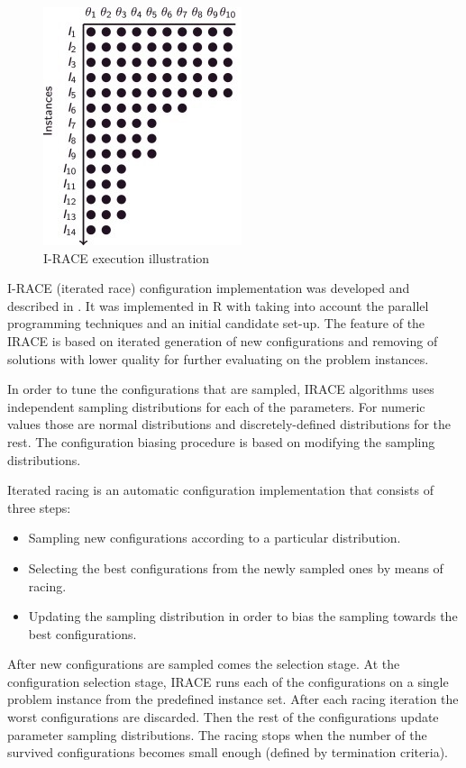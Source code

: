 \documentclass[12pt]{article}
\begin{document}
\begin{figure}[H]
  \centering
    \includegraphics[scale=1.2]{irace.jpg}
  \caption{I-RACE execution illustration}
  \label{fig:irace}
\end{figure}


I-RACE (iterated race) configuration implementation was developed and described in \cite{iraceaac}. It was implemented in R with taking into account the parallel programming techniques and an initial candidate set-up. The feature of the IRACE is based on iterated generation of new configurations and removing of solutions with lower quality for further evaluating on the problem instances.

In order to tune the configurations that are sampled, IRACE algorithms uses independent sampling distributions for each of the parameters. For numeric values those are normal distributions and discretely-defined distributions for the rest. The configuration biasing procedure is based on modifying the sampling distributions.

Iterated racing is an automatic configuration implementation that consists of three steps:

\begin{itemize}
\item Sampling new configurations according to a particular distribution.
\item Selecting the best configurations from the newly sampled ones by means of racing.
\item Updating the sampling distribution in order to bias the sampling towards the best configurations.
\end{itemize}

After new configurations are sampled comes the selection stage. At the configuration selection stage, IRACE runs each of the configurations on a single problem instance from the predefined instance set. After each racing iteration the worst configurations are discarded. Then the rest of the configurations update parameter sampling distributions. The racing stops when the number of the survived configurations becomes small enough (defined by termination criteria).
\end{document}
